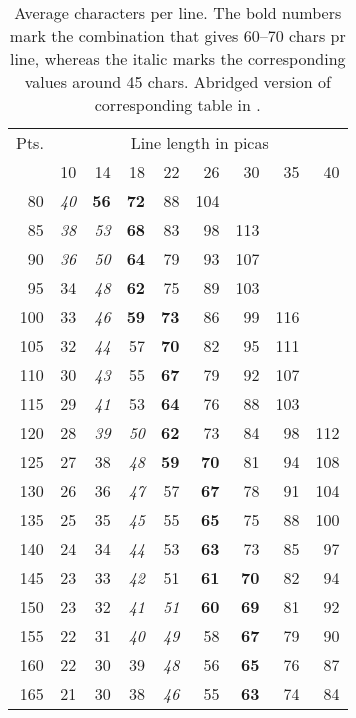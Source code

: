 \documentclass[10pt,a4paper,oneside,extrafontsizes]{memoir}%
\begin{document}
\begin{table}
\centering
\caption{Average characters per line. The bold numbers mark the
  combination that gives 60--70 chars pr line, whereas the italic
  marks the corresponding values around 45 chars. Abridged version of
  corresponding table in \cite{BRINGHURST99}.} \label{tab:copyfitting}
\begin{tabular}{r|rrrrrrrr} \hline
Pts. & \multicolumn{8}{c}{Line length in picas} \\
     & 10 & 14 & 18 & 22 & 26  & 30  & 35 & 40 \\ \hline
80   & \textit{40} & \textbf{56} & \textbf{72} & 88 & 104 &     &    &    \\
85   & \textit{38} & \textit{53} & \textbf{68} & 83 & 98 & 113 &    &    \\
90   & \textit{36} & \textit{50} & \textbf{64} & 79 & 93 & 107 &    &    \\
95   & 34 & \textit{48} & \textbf{62} & 75 & 89 & 103 &    &    \\
100  & 33 & \textit{46} & \textbf{59} & \textbf{73} & 86 & 99 & 116 &   \\
105  & 32 & \textit{44} & 57 & \textbf{70} & 82 & 95 & 111 &   \\
110  & 30 & \textit{43} & 55 & \textbf{67} & 79 & 92 & 107 &   \\
115  & 29 & \textit{41} & 53 & \textbf{64} & 76 & 88 & 103 &   \\
120  & 28 & \textit{39} & \textit{50} & \textbf{62} & 73 & 84 & 98 & 112 \\
125  & 27 & 38 & \textit{48} & \textbf{59} & \textbf{70} & 81 & 94 & 108 \\
130  & 26 & 36 & \textit{47} & 57 & \textbf{67} & 78 & 91 & 104 \\
135  & 25 & 35 & \textit{45} & 55 & \textbf{65} & 75 & 88 & 100 \\
140  & 24 & 34 & \textit{44} & 53 & \textbf{63} & 73 & 85 & 97 \\
145  & 23 & 33 & \textit{42} & 51 & \textbf{61} & \textbf{70} & 82 & 94 \\
150  & 23 & 32 & \textit{41} & \textit{51} & \textbf{60} & \textbf{69} & 81 & 92 \\
155  & 22 & 31 & \textit{40} & \textit{49} & 58 & \textbf{67} & 79 & 90 \\
160  & 22 & 30 & 39 & \textit{48} & 56 & \textbf{65} & 76 & 87 \\
165  & 21 & 30 & 38 & \textit{46} & 55 & \textbf{63} & 74 & 84 \\

\end{tabular}
\end{table}
\end{document}
